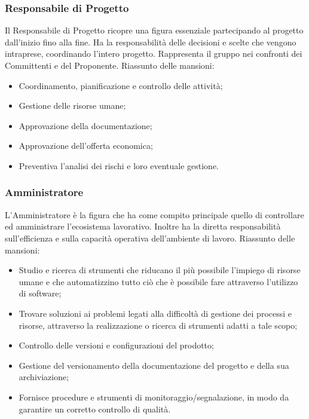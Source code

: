 	\subsubsection{Responsabile di Progetto}
	Il Responsabile di Progetto ricopre una figura essenziale partecipando al progetto dall'inizio fino alla fine. Ha la responsabilità delle decisioni e scelte che vengono intraprese, coordinando l'intero progetto. Rappresenta il gruppo nei confronti dei Committenti e del Proponente.
	Riassunto delle mansioni:
	\begin{itemize}
		\item Coordinamento, pianificazione e controllo delle attività;
		\item Gestione delle risorse umane;
		\item Approvazione della documentazione;
		\item Approvazione dell'offerta economica;
		\item Preventiva l'analisi dei rischi e loro eventuale gestione.
	\end{itemize}
	
	\subsubsection{Amministratore}
	L'Amministratore è la figura che ha come compito principale quello di controllare ed amministrare l'ecosistema lavorativo. Inoltre ha la diretta responsabilità sull'efficienza e sulla capacità operativa dell'ambiente di lavoro.
	Riassunto delle mansioni:
	\begin{itemize}
		\item Studio e ricerca di strumenti che riducano il più possibile l'impiego di risorse umane e che automatizzino tutto ciò che è possibile fare attraverso l'utilizzo di software;
		\item Trovare soluzioni ai problemi legati alla difficoltà di gestione dei processi e risorse, attraverso la realizzazione o ricerca di strumenti adatti a tale scopo;
		\item Controllo delle versioni e configurazioni del prodotto;
		\item Gestione del versionamento della documentazione del progetto e della sua archiviazione;
		\item Fornisce procedure e strumenti di monitoraggio/segnalazione, in modo da garantire un corretto controllo di qualità.
	\end{itemize}

